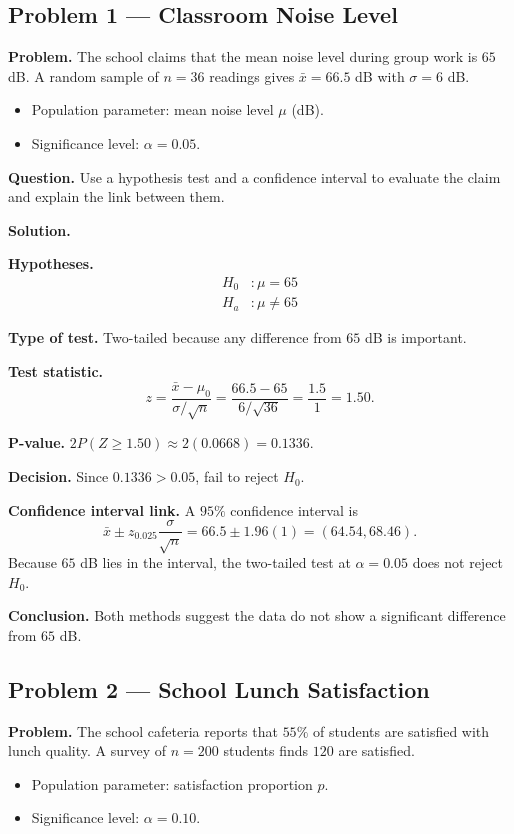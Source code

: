 	\subsection*{Problem 1 — Classroom Noise Level}
	
	\textbf{Problem.} The school claims that the mean noise level during group work is $65$ dB. A random sample of $n=36$ readings gives $\bar{x}=66.5$ dB with $\sigma=6$ dB.
	\begin{itemize}
		\item Population parameter: mean noise level $\mu$ (dB).
		\item Significance level: $\alpha=0.05$.
	\end{itemize}
	
	\textbf{Question.} Use a hypothesis test and a confidence interval to evaluate the claim and explain the link between them.
	
	\textbf{Solution.}
	
	\textbf{Hypotheses.}
	\[
	\begin{aligned}
		H_0&: \mu = 65 \\
		H_a&: \mu \neq 65
	\end{aligned}
	\]
	
	\textbf{Type of test.} Two-tailed because any difference from $65$ dB is important.
	
	\textbf{Test statistic.}
	\[
	z = \frac{\bar{x}-\mu_0}{\sigma/\sqrt{n}} = \frac{66.5-65}{6/\sqrt{36}} = \frac{1.5}{1} = 1.50.
	\]
	
	\textbf{P-value.} $2P(Z\ge 1.50)\approx 2(0.0668)=0.1336$.
	
	\textbf{Decision.} Since $0.1336>0.05$, fail to reject $H_0$.
	
	\textbf{Confidence interval link.} A $95\%$ confidence interval is
	\[
	\bar{x} \pm z_{0.025}\frac{\sigma}{\sqrt{n}} = 66.5 \pm 1.96(1) = (64.54, 68.46).
	\]
	Because $65$ dB lies in the interval, the two-tailed test at $\alpha=0.05$ does not reject $H_0$.
	
	\textbf{Conclusion.} Both methods suggest the data do not show a significant difference from $65$ dB.
	
	\hypertarget{c8-ex2}{}
	\subsection*{Problem 2 — School Lunch Satisfaction}
	
	\textbf{Problem.} The school cafeteria reports that $55\%$ of students are satisfied with lunch quality. A survey of $n=200$ students finds $120$ are satisfied.
	\begin{itemize}
		\item Population parameter: satisfaction proportion $p$.
		\item Significance level: $\alpha=0.10$.
	\end{itemize}
	
